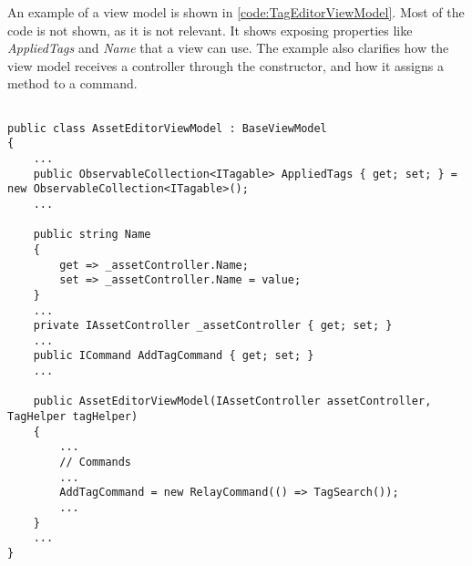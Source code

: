 An example of a view model is shown in \autoref{code:TagEditorViewModel}. Most of the code is not shown, as it is not relevant. It shows exposing properties like \textit{AppliedTags} and \textit{Name} that a view can use. The example also clarifies how the view model receives a controller through the constructor, and how it assigns a method to a command.

\begin{listing}[H]
\begin{verbatim}

public class AssetEditorViewModel : BaseViewModel
{
    ...
    public ObservableCollection<ITagable> AppliedTags { get; set; } = new ObservableCollection<ITagable>();
    ...

    public string Name
    {
        get => _assetController.Name;
        set => _assetController.Name = value;
    }
    ...
    private IAssetController _assetController { get; set; }
    ...
    public ICommand AddTagCommand { get; set; }
    ...

    public AssetEditorViewModel(IAssetController assetController, TagHelper tagHelper)
    {
        ...
        // Commands
        ...
        AddTagCommand = new RelayCommand(() => TagSearch());
        ...
    }
    ...
}

\end{verbatim}
\label{code:AssetEditorViewModel}
\end{listing}